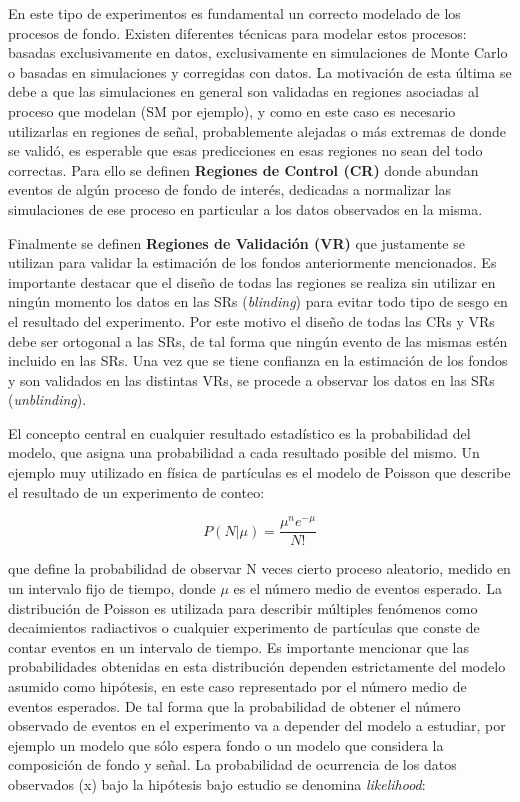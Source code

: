 En este tipo de experimentos es fundamental un correcto modelado de los procesos de fondo. Existen diferentes técnicas para modelar estos procesos: basadas exclusivamente en datos, exclusivamente en simulaciones de Monte Carlo o basadas en simulaciones y corregidas con datos. La motivación de esta última se debe a que las simulaciones en general son validadas en regiones asociadas al proceso que modelan (SM por ejemplo), y como en este caso es necesario utilizarlas en regiones de señal, probablemente alejadas o más extremas de donde se validó, es esperable que esas predicciones en esas regiones no sean del todo correctas. Para ello se definen \textbf{Regiones de Control (CR)} donde abundan eventos de algún proceso de fondo de interés, dedicadas a normalizar las simulaciones de ese proceso en particular a los datos observados en la misma.

Finalmente se definen \textbf{Regiones de Validación (VR)} que justamente se utilizan para validar la estimación de los fondos anteriormente mencionados. Es importante destacar que el diseño de todas las regiones se realiza sin utilizar en ningún momento los datos en las SRs (\textit{blinding}) para evitar todo tipo de sesgo en el resultado del experimento. Por este motivo el diseño de todas las CRs y VRs debe ser ortogonal a las SRs, de tal forma que ningún evento de las mismas estén incluido en las SRs. Una vez que se tiene confianza en la estimación de los fondos y son validados en las distintas VRs, se procede a observar los datos en las SRs (\textit{unblinding}).

El concepto central en cualquier resultado estadístico es la probabilidad del modelo, que asigna una probabilidad a cada resultado posible del mismo. Un ejemplo muy utilizado en física de partículas es el modelo de Poisson que describe el resultado de un experimento de conteo:

\begin{equation}
	P(N|\mu) = \frac{\mu^{n}e^{-\mu}}{N!}
\end{equation}

que define la probabilidad de observar N veces cierto proceso aleatorio, medido en un intervalo fijo de tiempo, donde $\mu$ es el número medio de eventos esperado. La distribución de Poisson es utilizada para describir múltiples fenómenos como decaimientos radiactivos o cualquier experimento de partículas que conste de contar eventos en un intervalo de tiempo. Es importante mencionar que las probabilidades obtenidas en esta distribución dependen estrictamente del modelo asumido como hipótesis, en este caso representado por el número medio de eventos esperados. De tal forma que la probabilidad de obtener el número observado de eventos en el experimento va a depender del modelo a estudiar, por ejemplo un modelo que sólo espera fondo o un modelo que considera la composición de fondo y señal. La probabilidad de ocurrencia de los datos observados (x) bajo la hipótesis bajo estudio se denomina \textit{likelihood}:

